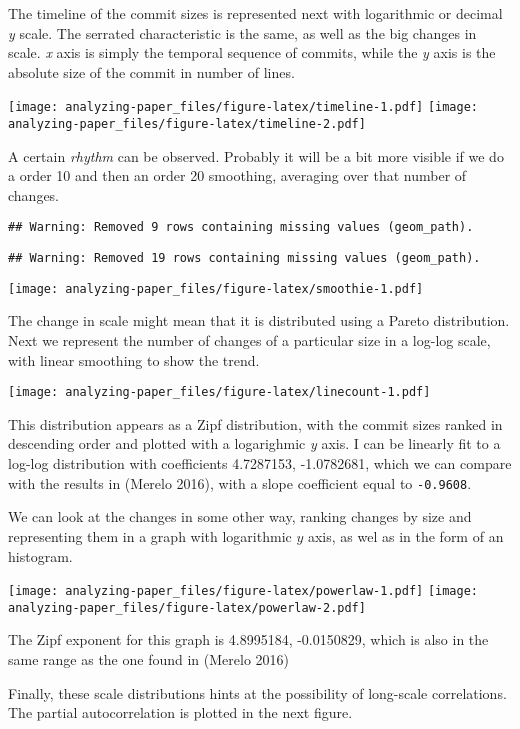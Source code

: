 \documentclass[]{article}
\begin{document}
The timeline of the commit sizes is represented next with logarithmic or
decimal \emph{y} scale. The serrated characteristic is the same, as well
as the big changes in scale. \emph{x} axis is simply the temporal
sequence of commits, while the \emph{y} axis is the absolute size of the
commit in number of lines.

\texttt{[image: analyzing-paper\_files/figure-latex/timeline-1.pdf]}
\texttt{[image: analyzing-paper\_files/figure-latex/timeline-2.pdf]}

A certain \emph{rhythm} can be observed. Probably it will be a bit more
visible if we do a order 10 and then an order 20 smoothing, averaging
over that number of changes.

\begin{verbatim}
## Warning: Removed 9 rows containing missing values (geom_path).
\end{verbatim}

\begin{verbatim}
## Warning: Removed 19 rows containing missing values (geom_path).
\end{verbatim}

\texttt{[image: analyzing-paper\_files/figure-latex/smoothie-1.pdf]}

The change in scale might mean that it is distributed using a Pareto
distribution. Next we represent the number of changes of a particular
size in a log-log scale, with linear smoothing to show the trend.

\texttt{[image: analyzing-paper\_files/figure-latex/linecount-1.pdf]}

This distribution appears as a Zipf distribution, with the commit sizes
ranked in descending order and plotted with a logarighmic \emph{y} axis.
I can be linearly fit to a log-log distribution with coefficients
4.7287153, -1.0782681, which we can compare with the results in (Merelo
2016), with a slope coefficient equal to \texttt{-0.9608}.

We can look at the changes in some other way, ranking changes by size
and representing them in a graph with logarithmic \(y\) axis, as wel as
in the form of an histogram.

\texttt{[image: analyzing-paper\_files/figure-latex/powerlaw-1.pdf]}
\texttt{[image: analyzing-paper\_files/figure-latex/powerlaw-2.pdf]}

The Zipf exponent for this graph is 4.8995184, -0.0150829, which is also
in the same range as the one found in (Merelo 2016)

Finally, these scale distributions hints at the possibility of
long-scale correlations. The partial autocorrelation is plotted in the
next figure.
\end{document}
